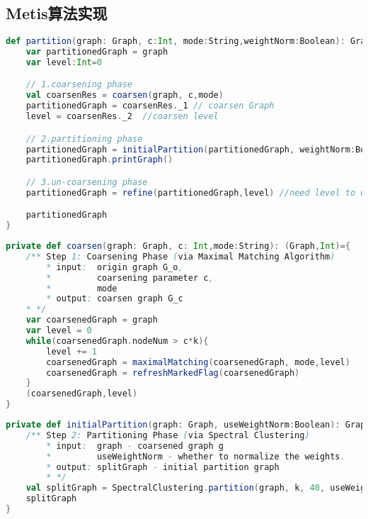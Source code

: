 \subsection{Metis算法实现}

\begin{lstlisting}[language=Scala]
def partition(graph: Graph, c:Int, mode:String,weightNorm:Boolean): Graph={
    var partitionedGraph = graph
    var level:Int=0 

    // 1.coarsening phase
    val coarsenRes = coarsen(graph, c,mode)
    partitionedGraph = coarsenRes._1 // coarsen Graph
    level = coarsenRes._2  //coarsen level

    // 2.partitioning phase
    partitionedGraph = initialPartition(partitionedGraph, weightNorm:Boolean)
    partitionedGraph.printGraph()

    // 3.un-coarsening phase
    partitionedGraph = refine(partitionedGraph,level) //need level to decide refine order

    partitionedGraph
}
\end{lstlisting}

\begin{lstlisting}[language=Scala]
private def coarsen(graph: Graph, c: Int,mode:String): (Graph,Int)={
    /** Step 1: Coarsening Phase (via Maximal Matching Algorithm)
        * input:  origin graph G_o,
        *         coarsening parameter c,
        *         mode
        * output: coarsen graph G_c
    * */
    var coarsenedGraph = graph
    var level = 0
    while(coarsenedGraph.nodeNum > c*k){
        level += 1
        coarsenedGraph = maximalMatching(coarsenedGraph, mode,level)
        coarsenedGraph = refreshMarkedFlag(coarsenedGraph)
    }
    (coarsenedGraph,level)
}
\end{lstlisting}

\begin{lstlisting}[language=Scala]
private def initialPartition(graph: Graph, useWeightNorm:Boolean): Graph={
    /** Step 2: Partitioning Phase (via Spectral Clustering)
        * input:  graph - coarsened graph g
        *         useWeightNorm - whether to normalize the weights.
        * output: splitGraph - initial partition graph
        * */
    val splitGraph = SpectralClustering.partition(graph, k, 40, useWeightNorm)
    splitGraph
}
\end{lstlisting}


